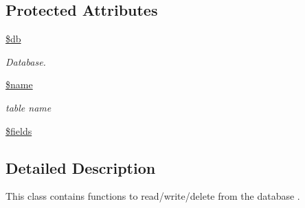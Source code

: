 \subsection*{Protected Attributes}
\begin{DoxyCompactItemize}
\item 
\hyperlink{class_table_a1fa3127fc82f96b1436d871ef02be319}{\$db}
\begin{DoxyCompactList}\small\item\em Database. \end{DoxyCompactList}\item 
\hyperlink{class_table_ab2fc40d43824ea3e1ce5d86dee0d763b}{\$name}
\begin{DoxyCompactList}\small\item\em table name \end{DoxyCompactList}\item 
\hyperlink{class_table_ab2303c817e3b402b77b7f99627b9c319}{\$fields}
\end{DoxyCompactItemize}


\subsection{Detailed Description}
This class contains functions to read/write/delete from the database . 

